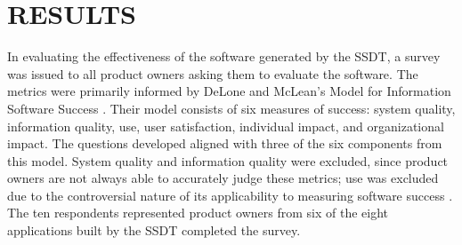 \section{RESULTS}

In evaluating the effectiveness of the software generated by the SSDT, a survey was issued to all product owners asking them to evaluate the software. The metrics were primarily informed by DeLone and McLean's Model for Information Software Success \cite{delone1992softwaresuccess}. Their model consists of six measures of success: system quality, information quality, use, user satisfaction, individual impact, and organizational impact. The questions developed aligned with three of the six components from this model. System quality and information quality were excluded, since product owners are not always able to accurately judge these metrics; use was excluded due to the controversial nature of its applicability to measuring software success \cite{delone2003delone}.  The ten respondents represented product owners from six of the eight applications built by the SSDT completed the survey.


